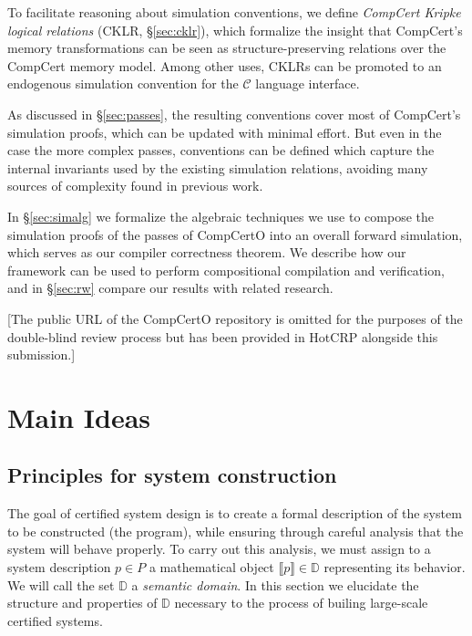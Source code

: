 \documentclass[sigplan,10pt,review,anonymous]{acmart}\settopmatter{printfolios=true,printccs=false,printacmref=false}
\begin{document}
To facilitate reasoning about
simulation conventions,
we define \emph{CompCert Kripke logical relations}
(CKLR, \S\ref{sec:cklr}),
which formalize the insight that
CompCert's memory transformations can be seen
as structure-preserving relations
over the CompCert memory model.
Among other uses,
CKLRs can be promoted to an endogenous
simulation convention for the $\mathcal{C}$
language interface.

As discussed in \S\ref{sec:passes},
the resulting conventions
cover most of CompCert's simulation proofs,
which can be updated with minimal effort.
But even in the case the more complex passes,
conventions can be defined
which capture the internal invariants
used by the existing simulation relations,
avoiding many sources of complexity found
in previous work.

In \S\ref{sec:simalg} we formalize the algebraic techniques
we use to compose the simulation proofs of the passes of CompCertO
into an overall forward simulation,
which serves as our compiler correctness theorem.
We describe how our framework
can be used to perform compositional compilation and verification,
and in \S\ref{sec:rw} compare our results with related research.

[The public URL of the CompCertO repository is omitted
for the purposes of the double-blind review process
but has been provided in HotCRP alongside this submission.]



\section{Main Ideas} \label{sec:mainideas} %

\subsection{Principles for system construction} \label{sec:principles} %


The goal of certified system design is
to create a formal description of
the system to be constructed (the program),
while ensuring through careful analysis that the system
will behave properly.
To carry out this analysis,
we must assign
to a system description $p \in P$
a mathematical object $\llbracket p \rrbracket \in \mathbb{D}$
representing its behavior.
We will call the set $\mathbb{D}$ a \emph{semantic domain}.
In this section we elucidate
the structure and properties of $\mathbb{D}$
necessary to the process of builing
large-scale certified systems.
\end{document}
